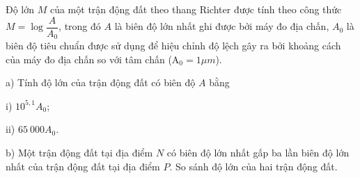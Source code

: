 \begin{bt}%
	Độ lớn $ M $ của một trận động đất theo thang Richter được tính theo công thức $ M=\log \dfrac{A}{A_0} $, trong đó $ A $ là biên độ lớn nhất ghi được bởi máy đo địa chấn, $ A_0 $ là biên độ tiêu chuẩn được sử dụng để hiệu chỉnh độ lệch gây ra bởi khoảng cách của máy đo địa chấn so với tâm chấn ($ \mathrm{A}_0=1 \mu m$).
	\begin{listEX}[1]
		\item[a)] Tính độ lớn của trận động đất có biên độ $A$ bằng
		\begin{listEX}[2]
			\item[i)] $ 10^{5{,}1}A_0 $;
			\item[ii)] $ 65~000 A_0$.  
		\end{listEX}
		\item[b)] Một trận động đất tại địa điểm $ N $ có biên độ lớn nhất gấp ba lần biên độ lớn nhất của trận động đất tại địa điểm $ P $. So sánh độ lớn của hai trận động đất.
	\end{listEX}
\end{bt}


